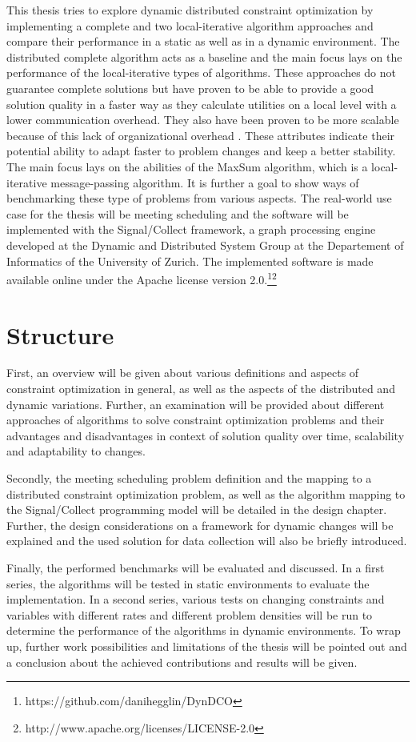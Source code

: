 This thesis tries to explore dynamic distributed constraint optimization by implementing a complete and two local-iterative algorithm approaches and compare their performance in a static as well as in a dynamic environment. The distributed complete algorithm acts as a baseline and the main focus lays on the performance of the local-iterative types of algorithms. These approaches do not guarantee complete solutions but have proven to be able to provide a good solution quality in a faster way as they calculate utilities on a local level with a lower communication overhead. They also have been proven to be more scalable because of this lack of organizational overhead \cite{Chapman2011}. These attributes indicate their potential ability to adapt faster to problem changes and keep a better stability. The main focus lays on the abilities of the MaxSum algorithm, which is a local-iterative message-passing algorithm. It is further a goal to show ways of benchmarking these type of problems from various aspects. The real-world use case for the thesis will be meeting scheduling and the software will be implemented with the Signal/Collect framework, a graph processing engine developed at  the Dynamic and Distributed System Group at the Departement of Informatics of the University of Zurich.
\newline \newline
The implemented software is made available online under the Apache license version 2.0.\footnote{https://github.com/danihegglin/DynDCO}\footnote{http://www.apache.org/licenses/LICENSE-2.0}


\section{Structure}
First, an overview will be given about various definitions and aspects of constraint optimization in general, as well as the aspects of  the distributed and dynamic variations. Further, an examination will be provided about different approaches of algorithms to solve constraint optimization problems and their advantages and disadvantages in context of solution quality over time, scalability and adaptability to changes. 

Secondly, the meeting scheduling problem definition and the mapping to a distributed constraint optimization problem, as well as the algorithm mapping to the Signal/Collect programming model will be detailed in the design chapter. Further, the design considerations on a framework for dynamic changes will be explained and the used solution for data collection will also be briefly introduced.

Finally, the performed benchmarks will be evaluated and discussed. In a first series, the algorithms will be tested in static environments to evaluate the implementation. In a second series, various tests on changing constraints and variables with different rates and different problem densities will be run to determine the performance of the algorithms in dynamic environments. To wrap up, further work possibilities and limitations of the thesis will be pointed out and a conclusion about the achieved contributions and results will be given.